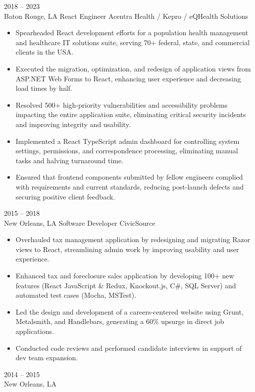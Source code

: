 \documentclass[9pt]{resume} %
\begin{document}

\begin{entrylist}
	\entry
		{2018 -- 2023\\\footnotesize{Baton Rouge, LA}}
		{React Engineer}
		{Acentra Health / Kepro / eQHealth Solutions}
		{
			\begin{itemize}
				\item Spearheaded React development efforts for a population health management and healthcare IT solutions suite, serving 70+ federal, state, and commercial clients in the USA.
				\item Executed the migration, optimization, and redesign of application views from ASP.NET Web Forms to React, enhancing user experience and decreasing load times by half.
				\item Resolved 500+ high-priority vulnerabilities and accessibility problems impacting the entire application suite, eliminating critical security incidents and improving integrity and usability.
				\item Implemented a React TypeScript admin dashboard for controlling system settings, permissions, and correspondence processing, eliminating manual tasks and halving turnaround time.
				\item Ensured that frontend components submitted by fellow engineers complied with requirements and current standards, reducing post-launch defects and securing positive client feedback.
			\end{itemize}
		}
	\entry
		{2015 -- 2018\\\footnotesize{New Orleans, LA}}
		{Software Developer}
		{CivicSource}
		{
			\begin{itemize}
				\item Overhauled tax management application by redesigning and migrating Razor views to React, streamlining admin work by improving usability and user experience.
				\item Enhanced tax and foreclosure sales application by developing 100+ new features (React JavaScript \& Redux, Knockout.js, C\#, SQL Server) and automated test cases (Mocha, MSTest).
				\item Led the design and development of a careers-centered website using Grunt, Metalsmith, and Handlebars, generating a 60\% upsurge in direct job applications.
				\item Conducted code reviews and performed candidate interviews in support of dev team expansion.
			\end{itemize}
		}
	\entry
		{2014 -- 2015\\\footnotesize{New Orleans, LA}}

\end{entrylist}
\end{document}
